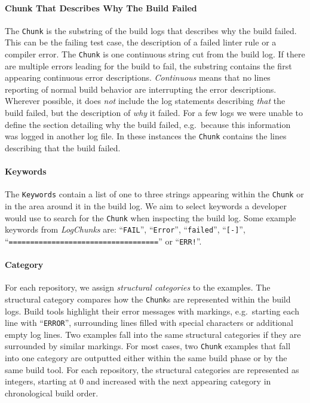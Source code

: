 \documentclass[\myrootdir/main.tex]{subfiles}
\begin{document}
\paragraph{Chunk That Describes Why The Build Failed}
The \texttt{Chunk} is the substring of the build logs that describes why the build failed.
This can be the failing test case, the description of a failed linter rule or a compiler error.
The \texttt{Chunk} is one continuous string cut from the build log.
If there are multiple errors leading for the build to fail, the substring contains the first appearing continuous error descriptions.
\emph{Continuous} means that no lines reporting of normal build behavior are interrupting the error descriptions.
Wherever possible, it does \emph{not} include the log statements describing \emph{that} the build failed, but the description of \emph{why} it failed.
For a few logs we were unable to define the section detailing why the build failed, e.g.\ because this information was logged in another log file.
In these instances the \texttt{Chunk} contains the lines describing that the build failed.

\paragraph{Keywords}
The \texttt{Keywords} contain a list of one to three strings appearing within the \texttt{Chunk} or in the area around it in the build log.
We aim to select keywords a developer would use to search for the \texttt{Chunk} when inspecting the build log.
Some example keywords from \emph{LogChunks} are: ``\texttt{FAIL}'', ``\texttt{Error}'', ``\texttt{failed}'', ``\texttt{[-]}'', ``\texttt{===================================}'' or ``\texttt{ERR!}''.

\paragraph{Category}
For each repository, we assign \emph{structural categories} to the examples.
The structural category compares how the \texttt{Chunk}s are represented within the build logs.
Build tools highlight their error messages with markings, e.g.\ starting each line with ``\texttt{ERROR}'', surrounding lines filled with special characters or additional empty log lines.
Two examples fall into the same structural categories if they are surrounded by similar markings.
For most cases, two \texttt{Chunk} examples that fall into one category are outputted either within the same build phase or by the same build tool.
For each repository, the structural categories are represented as integers, starting at 0 and increased with the next appearing category in chronological build order.
\end{document}
